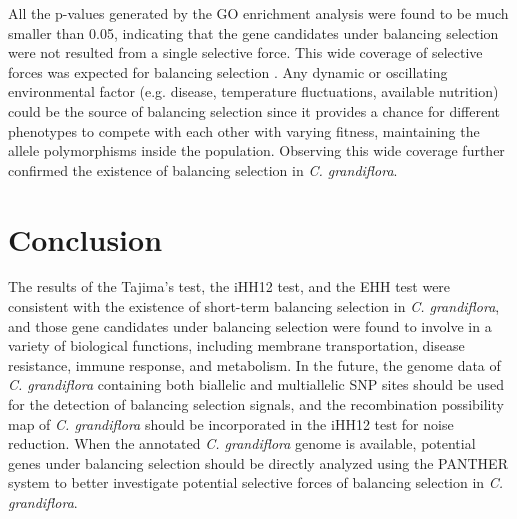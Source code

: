 All the p-values generated by the GO enrichment analysis were found to be much smaller than 0.05, indicating that the gene candidates under balancing selection were not resulted from a single selective force. This wide coverage of selective forces was expected for balancing selection \citep{RN1}. Any dynamic or oscillating environmental factor (e.g. disease, temperature fluctuations, available nutrition) could be the source of balancing selection since it provides a chance for different phenotypes to compete with each other with varying fitness, maintaining the allele polymorphisms inside the population. Observing this wide coverage further confirmed the existence of balancing selection in \emph{C. grandiflora}.

\section{Conclusion}
The results of the Tajima’s test, the iHH12 test, and the EHH test were consistent with the existence of short-term balancing selection in \emph{C. grandiflora}, and those gene candidates under balancing selection were found to involve in a variety of biological functions, including membrane transportation, disease resistance, immune response, and metabolism. In the future, the genome data of \emph{C. grandiflora} containing both biallelic and multiallelic SNP sites should be used for the detection of balancing selection signals, and the recombination possibility map of \emph{C. grandiflora} should be incorporated in the iHH12 test for noise reduction. When the annotated \emph{C. grandiflora} genome is available, potential genes under balancing selection should be directly analyzed using the PANTHER system to better investigate potential selective forces of balancing selection in \emph{C. grandiflora}.